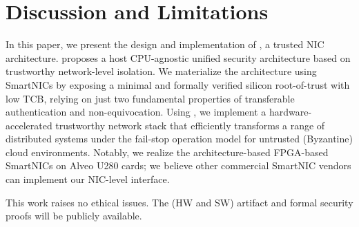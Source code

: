 \section{Discussion and Limitations}
In this paper, we present the design and implementation of \projecttitle{}, a trusted NIC architecture. \projecttitle{} proposes a host CPU-agnostic unified security architecture based on trustworthy network-level isolation. We materialize the \projecttitle{} architecture using SmartNICs by exposing a minimal and formally verified silicon root-of-trust with low TCB, relying on just two fundamental properties of transferable authentication and non-equivocation. Using \projecttitle{}, we implement a hardware-accelerated trustworthy network stack that efficiently transforms a range of distributed systems under the fail-stop operation model for untrusted (Byzantine) cloud environments. Notably, we realize the \projecttitle{} architecture-based FPGA-based SmartNICs on Alveo U280 cards; we believe other commercial SmartNIC vendors can implement our NIC-level interface.


 This work raises no ethical issues. The \projecttitle{} (HW and SW) artifact and formal security proofs will be publicly available.





